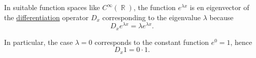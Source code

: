 \begin{example}
\begin{thmenum}
     In suitable function spaces like \( C^\infty(\BbbR) \), the function \( e^{\lambda x} \) is en eigenvector of the \hyperref[def:differentiability]{differentiation} operator \( D_x \) corresponding to the eigenvalue \( \lambda \) because
    \begin{equation*}
      D_x e^{\lambda x} = \lambda e^{\lambda x}.
    \end{equation*}

    In particular, the case \( \lambda = 0 \) corresponds to the constant function \( e^0 = 1 \), hence
    \begin{equation*}
      D_x 1 = 0 \cdot 1.
    \end{equation*}
  \end{thmenum}
\end{example}

